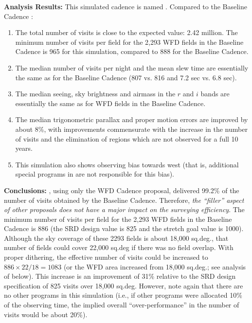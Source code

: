 {\bf Analysis Results:} This simulated cadence is named .
Compared to the Baseline Cadence :
\begin{enumerate}
\item The total number of visits is close to the expected value: 2.42
  million.  The minimum number of visits per field for the 2,293 WFD
  fields in the Baseline Cadence is 965 for this simulation, compared to
  888 for the Baseline Cadence.
\item The median number of visits per night and the mean slew time are
  essentially the same as for the Baseline Cadence (807 vs. 816 and 7.2
  sec vs. 6.8 sec).
\item The median seeing, sky brightness and airmass in the $r$ and $i$ bands are
      essentially the same as for WFD fields in the Baseline Cadence.
\item The median trigonometric parallax and proper motion errors are
  improved by about 8\%, with improvements commensurate with the
  increase in the number of visits and the elimination of regions
  which are not observed for a full 10 years.
\item This simulation also shows observing bias towards west (that is,
  additional special programs in  are not
  responsible for this bias).
\end{enumerate}


{\bf Conclusions:} , using only the WFD Cadence
proposal, delivered 99.2\% of the number of visits obtained by the
Baseline Cadence. Therefore, {\it the ``filler'' aspect of other
proposals does not have a major impact on the surveying efficiency}.
The minimum number of visits per field for the 2,293 WFD fields in the
Baseline Cadence is 886 (the SRD design value is 825 and the stretch
goal value is 1000). Although the sky coverage of these 2293 fields is
about 18,000 sq.deg., that number of fields could cover 22,000 sq.deg if there was no field overlap. With
proper dithering, the effective number of visits could be increased to
$886\times22/18 = 1083$ (or the WFD area increased from 18,000 sq.deg.; see
analysis of  below). This increase is an improvement of 31\%
relative to the SRD design specification of 825 visits over 18,000
sq.deg. However, note again that there are no other programs in this
simulation (i.e., if other programs were allocated 10\% of the
observing time, the implied overall ``over-performance'' in the number
of  visits would be about 20\%).

